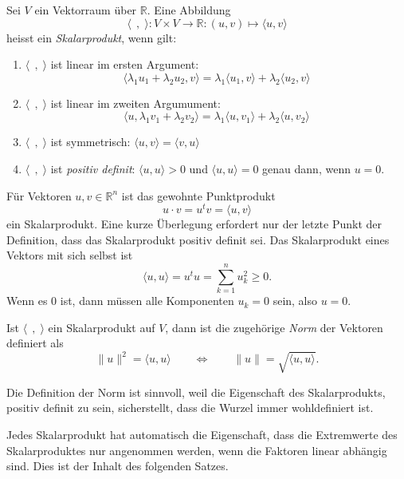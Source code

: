 \begin{definition}
Sei $V$ ein Vektorraum über $\mathbb R$.
Eine Abbildung
\[
\langle\;\,,\;\rangle
\colon
V\times V\to\mathbb R
:
(u,v)\mapsto \langle u,v\rangle
\]
heisst ein {\em Skalarprodukt}, wenn gilt:
%
\begin{enumerate}
\item $\langle\;\,,\;\rangle$ ist linear im ersten Argument:
\begin{equation}
\langle \lambda_1 u_1+\lambda_2 u_2,v\rangle
=
\lambda_1 \langle u_1,v\rangle
+
\lambda_2 \langle u_2,v\rangle
\end{equation}
\item $\langle\;\,,\;\rangle$ ist linear im zweiten Argumument:
\begin{equation}
\langle u,\lambda_1 v_1+\lambda_2 v_2\rangle
=
\lambda_1 \langle u,v_1\rangle
+
\lambda_2 \langle u,v_2\rangle
\end{equation}
\item
$\langle\;\,,\;\rangle$
ist symmetrisch:
$\langle u,v\rangle=\langle v,u\rangle$
\item
$\langle\;\,,\;\rangle$
ist {\em positiv definit}: $\langle u,u\rangle > 0$ und
%
$\langle u,u\rangle=0$ genau dann, wenn $u=0$.
\end{enumerate}
\end{definition}

Für Vektoren $u,v\in\mathbb R^n$ ist das gewohnte Punktprodukt
\[
u\cdot v = u^t v = \langle u,v\rangle
\]
ein Skalarprodukt.
Eine kurze Überlegung erfordert nur der letzte Punkt der Definition,
dass das Skalarprodukt positiv definit sei.
Das Skalarprodukt eines Vektors mit sich selbst ist 
\[
\langle u,u\rangle = u^t u = \sum_{k=1}^n u_k^2 \ge 0.
\]
Wenn es $0$ ist, dann müssen alle Komponenten $u_k=0$ sein, also $u=0$.

\begin{definition}
Ist $\langle\;\,,\;\rangle$ ein Skalarprodukt auf $V$, dann ist die zugehörige
{\em Norm} der Vektoren definiert als
%
\[
\| u \|^2 = \langle u,u\rangle
\qquad\Leftrightarrow\qquad
\| u\| = \sqrt{\langle u,u\rangle}.
\]
\end{definition}

Die Definition der Norm ist sinnvoll, weil die Eigenschaft des Skalarprodukts,
positiv definit zu sein, sicherstellt, dass die Wurzel immer wohldefiniert
ist.

Jedes Skalarprodukt hat automatisch die Eigenschaft, dass die Extremwerte
des Skalarproduktes nur angenommen werden, wenn die Faktoren linear
abhängig sind.
Dies ist der Inhalt des folgenden Satzes.

